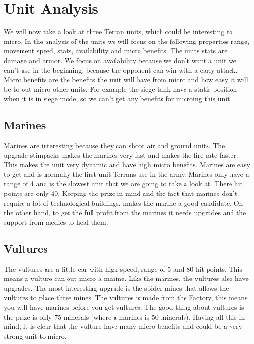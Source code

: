\section{Unit Analysis}
We will now take a look at three Terran units, which could be interesting to micro. In the analysis of the units we will
focus on the following properties range, movement speed, stats, availability and micro benefits. The units stats are damage
and armor. We focus on availability because we don't want a unit we can't use in the beginning, because the opponent can
win with a early attack. Micro benefits are the benefits the unit will have from micro and how easy it will be to out micro
other units. For example the siege tank have a static position when it is in siege mode, so we can't get any benefits for microing
this unit. 

\subsection{Marines}
Marines are interesting because they can shoot air and ground units. The upgrade stimpacks makes the marines very fast and makes the fire rate
faster. This makes the unit very dynamic and have high micro benefits. Marines are easy to get and is normally the first unit Terrans use in
the army. Marines only have a range of 4 and is the slowest unit that we are going to take a look at. There
hit points are only 40. Keeping the prize in mind and the fact that marines don't require a lot of
technological buildings, makes the marine a good candidate. On the other hand, to get the full profit from the
marines it needs upgrades and the support from medics to heal them. 

\subsection{Vultures}
The vultures are a little car with high speed, range of 5 and 80 hit points. This means a vulture can out micro a marine. Like the marines, the
vultures also have upgrades. The most interesting upgrade is the spider mines that allows the vultures to place three mines. The vultures is made
from the Factory, this means you will have marines before you get vultures. The good thing about vultures is the prize is only 75 minerals (where
a marines is 50 minerals). Having all this in mind, it is clear that the vulture have many micro benefits and could be a very strong unit to micro. 

